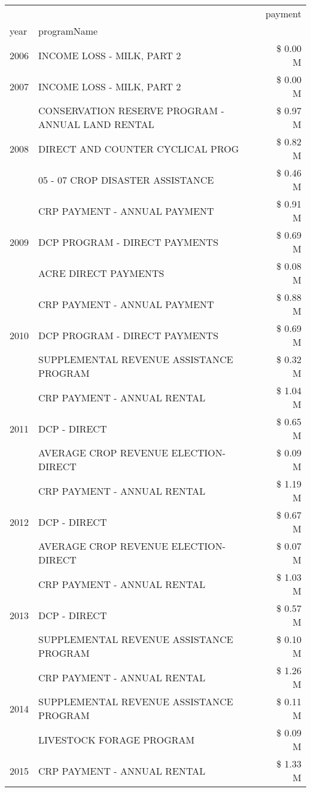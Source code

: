 \begin{tabular}{llr}
\toprule
 &  & payment \\
year & programName &  \\
\midrule
2006 & INCOME LOSS - MILK, PART 2 & \$ 0.00 M \\
\cline{1-3}
2007 & INCOME LOSS - MILK, PART 2 & \$ 0.00 M \\
\cline{1-3}
\multirow[t]{3}{*}{2008} & CONSERVATION RESERVE PROGRAM - ANNUAL LAND RENTAL & \$ 0.97 M \\
 & DIRECT AND COUNTER CYCLICAL PROG & \$ 0.82 M \\
 & 05 - 07 CROP DISASTER ASSISTANCE & \$ 0.46 M \\
\cline{1-3}
\multirow[t]{3}{*}{2009} & CRP PAYMENT - ANNUAL PAYMENT & \$ 0.91 M \\
 & DCP PROGRAM - DIRECT PAYMENTS & \$ 0.69 M \\
 & ACRE DIRECT PAYMENTS & \$ 0.08 M \\
\cline{1-3}
\multirow[t]{3}{*}{2010} & CRP PAYMENT - ANNUAL PAYMENT & \$ 0.88 M \\
 & DCP PROGRAM - DIRECT PAYMENTS & \$ 0.69 M \\
 & SUPPLEMENTAL REVENUE ASSISTANCE PROGRAM & \$ 0.32 M \\
\cline{1-3}
\multirow[t]{3}{*}{2011} & CRP PAYMENT - ANNUAL RENTAL & \$ 1.04 M \\
 & DCP - DIRECT & \$ 0.65 M \\
 & AVERAGE CROP REVENUE ELECTION-DIRECT & \$ 0.09 M \\
\cline{1-3}
\multirow[t]{3}{*}{2012} & CRP PAYMENT - ANNUAL RENTAL & \$ 1.19 M \\
 & DCP - DIRECT & \$ 0.67 M \\
 & AVERAGE CROP REVENUE ELECTION-DIRECT & \$ 0.07 M \\
\cline{1-3}
\multirow[t]{3}{*}{2013} & CRP PAYMENT - ANNUAL RENTAL & \$ 1.03 M \\
 & DCP - DIRECT & \$ 0.57 M \\
 & SUPPLEMENTAL REVENUE ASSISTANCE PROGRAM & \$ 0.10 M \\
\cline{1-3}
\multirow[t]{3}{*}{2014} & CRP PAYMENT - ANNUAL RENTAL & \$ 1.26 M \\
 & SUPPLEMENTAL REVENUE ASSISTANCE PROGRAM & \$ 0.11 M \\
 & LIVESTOCK FORAGE PROGRAM & \$ 0.09 M \\
\cline{1-3}
\multirow[t]{3}{*}{2015} & CRP PAYMENT - ANNUAL RENTAL & \$ 1.33 M \\

\end{tabular}
